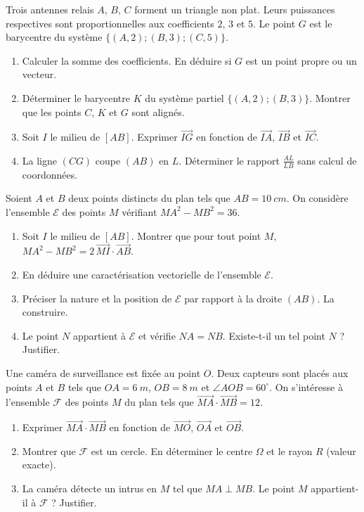 \documentclass[11pt]{article}
\begin{document}
\begin{exercice}
Trois antennes relais $A$, $B$, $C$ forment un triangle non plat. Leurs puissances respectives sont proportionnelles aux coefficients $2$, $3$ et $5$. Le point $G$ est le barycentre du système $\{(A,2);(B,3);(C,5)\}$.
\begin{enumerate}
    \item Calculer la somme des coefficients. En déduire si $G$ est un point propre ou un vecteur.
    \item Déterminer le barycentre $K$ du système partiel $\{(A,2);(B,3)\}$. Montrer que les points $C$, $K$ et $G$ sont alignés.
    \item Soit $I$ le milieu de $[AB]$. Exprimer $\overrightarrow{IG}$ en fonction de $\overrightarrow{IA}$, $\overrightarrow{IB}$ et $\overrightarrow{IC}$.
    \item La ligne $(CG)$ coupe $(AB)$ en $L$. Déterminer le rapport $\frac{AL}{LB}$ sans calcul de coordonnées.
\end{enumerate}
\end{exercice}

\begin{exercice}
Soient $A$ et $B$ deux points distincts du plan tels que $AB = \SI{10}{cm}$. On considère l'ensemble $\mathcal{E}$ des points $M$ vérifiant $MA^2 - MB^2 = 36$.
\begin{enumerate}
    \item Soit $I$ le milieu de $[AB]$. Montrer que pour tout point $M$, $MA^2 - MB^2 = 2\,\overrightarrow{MI}\cdot\overrightarrow{AB}$.
    \item En déduire une caractérisation vectorielle de l'ensemble $\mathcal{E}$.
    \item Préciser la nature et la position de $\mathcal{E}$ par rapport à la droite $(AB)$. La construire.
    \item Le point $N$ appartient à $\mathcal{E}$ et vérifie $NA = NB$. Existe-t-il un tel point $N$ ? Justifier.
\end{enumerate}
\end{exercice}

\begin{exercice}
Une caméra de surveillance est fixée au point $O$. Deux capteurs sont placés aux points $A$ et $B$ tels que $OA = \SI{6}{m}$, $OB = \SI{8}{m}$ et $\angle AOB = 60^\circ$. On s'intéresse à l'ensemble $\mathcal{F}$ des points $M$ du plan tels que $\overrightarrow{MA}\cdot\overrightarrow{MB} = 12$.
\begin{enumerate}
    \item Exprimer $\overrightarrow{MA}\cdot\overrightarrow{MB}$ en fonction de $\overrightarrow{MO}$, $\overrightarrow{OA}$ et $\overrightarrow{OB}$.
    \item Montrer que $\mathcal{F}$ est un cercle. En déterminer le centre $\Omega$ et le rayon $R$ (valeur exacte).
    \item La caméra détecte un intrus en $M$ tel que $MA \perp MB$. Le point $M$ appartient-il à $\mathcal{F}$ ? Justifier.
\end{enumerate}
\end{exercice}
\end{document}
